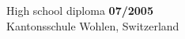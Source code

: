 \documentclass[margin,line]{resume}
\begin{document}
\begin{resume}
\begin{list2}
  \item High school diploma \hfill {\bf 07/2005}\\
  Kantonsschule Wohlen, Switzerland

\end{list2}










\end{resume}
\end{document}
